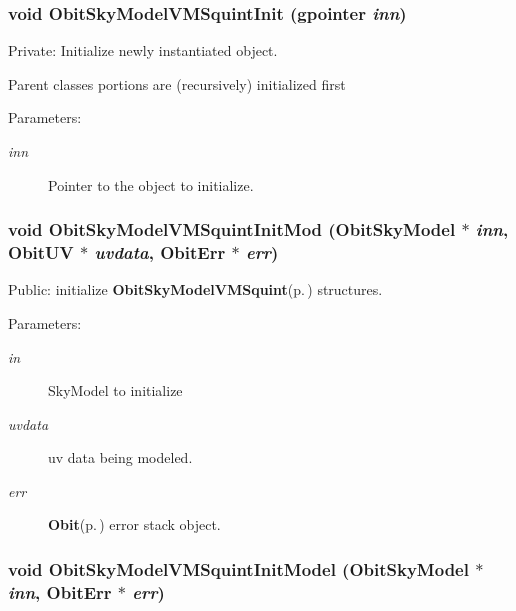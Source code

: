 \subsubsection{\setlength{\rightskip}{0pt plus 5cm}void Obit\-Sky\-Model\-VMSquint\-Init (gpointer {\em inn})}\label{ObitSkyModelVMSquint_8c_a6}


Private: Initialize newly instantiated object. 

Parent classes portions are (recursively) initialized first \begin{Desc}
\item[Parameters:]
\begin{description}
\item[{\em inn}]Pointer to the object to initialize. \end{description}
\end{Desc}
\subsubsection{\setlength{\rightskip}{0pt plus 5cm}void Obit\-Sky\-Model\-VMSquint\-Init\-Mod ({\bf Obit\-Sky\-Model} $\ast$ {\em inn}, {\bf Obit\-UV} $\ast$ {\em uvdata}, {\bf Obit\-Err} $\ast$ {\em err})}\label{ObitSkyModelVMSquint_8c_a19}


Public: initialize {\bf Obit\-Sky\-Model\-VMSquint}{\rm (p.\,\pageref{structObitSkyModelVMSquint})} structures. 

\begin{Desc}
\item[Parameters:]
\begin{description}
\item[{\em in}]Sky\-Model to initialize \item[{\em uvdata}]uv data being modeled. \item[{\em err}]{\bf Obit}{\rm (p.\,\pageref{structObit})} error stack object. \end{description}
\end{Desc}
\subsubsection{\setlength{\rightskip}{0pt plus 5cm}void Obit\-Sky\-Model\-VMSquint\-Init\-Model ({\bf Obit\-Sky\-Model} $\ast$ {\em inn}, {\bf Obit\-Err} $\ast$ {\em err})}\label{ObitSkyModelVMSquint_8c_a21}


